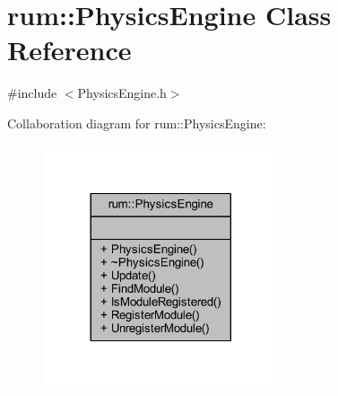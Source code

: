 \hypertarget{classrum_1_1_physics_engine}{}\section{rum\+:\+:Physics\+Engine Class Reference}
\label{classrum_1_1_physics_engine}


{\ttfamily \#include $<$Physics\+Engine.\+h$>$}



Collaboration diagram for rum\+:\+:Physics\+Engine\+:\nopagebreak
\begin{figure}[H]
\begin{center}
\leavevmode
\includegraphics[width=197pt]{classrum_1_1_physics_engine__coll__graph}
\end{center}
\end{figure}
